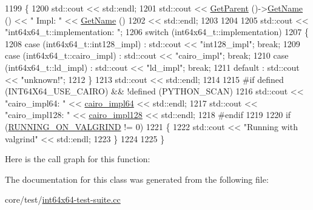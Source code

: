 \begin{DoxyCode}
1199 \{
1200   std::cout << std::endl;
1201   std::cout << \hyperlink{classns3_1_1TestCase_af41db0462b844c9f81838d0e61ecd563}{GetParent} ()->\hyperlink{classns3_1_1TestCase_a28f7bb59669c24dae1c290fc17fc9b62}{GetName} () << \textcolor{stringliteral}{" Impl: "} << \hyperlink{classns3_1_1TestCase_a28f7bb59669c24dae1c290fc17fc9b62}{GetName} ()
1202             << std::endl;
1203 
1204   
1205   std::cout << \textcolor{stringliteral}{"int64x64\_t::implementation: "};
1206   \textcolor{keywordflow}{switch} (int64x64\_t::implementation)
1207     \{
1208     \textcolor{keywordflow}{case} (int64x64\_t::int128\_impl) : std::cout << \textcolor{stringliteral}{"int128\_impl"}; \textcolor{keywordflow}{break};
1209     \textcolor{keywordflow}{case} (int64x64\_t::cairo\_impl)  : std::cout << \textcolor{stringliteral}{"cairo\_impl"};  \textcolor{keywordflow}{break};
1210     \textcolor{keywordflow}{case} (int64x64\_t::ld\_impl)     : std::cout << \textcolor{stringliteral}{"ld\_impl"};     \textcolor{keywordflow}{break};
1211     \textcolor{keywordflow}{default} :                        std::cout << \textcolor{stringliteral}{"unknown!"};    
1212     \}
1213   std::cout << std::endl;
1214 
1215 \textcolor{preprocessor}{#if defined (INT64X64\_USE\_CAIRO) && !defined (PYTHON\_SCAN)}
1216   std::cout << \textcolor{stringliteral}{"cairo\_impl64:  "} << \hyperlink{cairo-wideint-private_8h_a49cff5896e8f00bbdd461db2f8024ea1}{cairo\_impl64} << std::endl;
1217   std::cout << \textcolor{stringliteral}{"cairo\_impl128: "} << \hyperlink{cairo-wideint-private_8h_a660c34af82df7595e1a029af6c5f799f}{cairo\_impl128} << std::endl;
1218 \textcolor{preprocessor}{#endif}
1219 
1220   \textcolor{keywordflow}{if} (\hyperlink{valgrind_8h_a9f00625a835e796e264069df36212a1c}{RUNNING\_ON\_VALGRIND} != 0)
1221     \{
1222       std::cout << \textcolor{stringliteral}{"Running with valgrind"} << std::endl;
1223     \}
1224 
1225 \}
\end{DoxyCode}


Here is the call graph for this function\+:




The documentation for this class was generated from the following file\+:\begin{DoxyCompactItemize}
\item 
core/test/\hyperlink{int64x64-test-suite_8cc}{int64x64-\/test-\/suite.\+cc}\end{DoxyCompactItemize}
